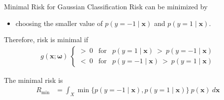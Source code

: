 \documentclass[xcolor=pdftex,dvipsnames,table]{beamer}
\begin{document}
\begin{frame}{Minimal Risk for Gaussian Classification}
	\fontsize{8}{3.1}\selectfont
	\vspace{12pt}
	\textcolor{NavyBlue}{Risk can be minimized by}
	\begin{itemize}
		\item choosing the smaller value of $p\left(y=-1 \mid \mathbf{x} \right)$ and $p\left(y=1 \mid \mathbf{x} \right)$.
	\end{itemize}
	 \textcolor{NavyBlue}{Therefore, risk is minimal if}
	\begin{eqnarray*}
		\label{eq:minrisk} g(\mathbf{x};\mathbf{\omega}) \ \left\{
		\begin{array}{lll}
		> \ 0 & \mbox{for} &  p\left(y=1 \mid \mathbf{x} \right) \ > \
		p\left(y=-1 \mid \mathbf{x} \right)\\
		< \ 0 & \mbox{for} & p\left(y=-1 \mid \mathbf{x} \right) \ > \ p\left(y=1
		\mid \mathbf{x} \right)
		\end{array} \right. 
	\end{eqnarray*}
	
	\textcolor{NavyBlue}{The minimal risk is}
	\begin{equation*}
		 \begin{split}
			R_{\mathrm{min}} %
			                 & =\int_{X}  \min\{ p\left(y=-1 \mid \mathbf{x} \right), p\left(y=1 \mid \mathbf{x}\right) \} \ p(\mathbf{x}) \ d\mathbf{x} 
		\end{split}
	\end{equation*}
\end{frame}
\end{document}
